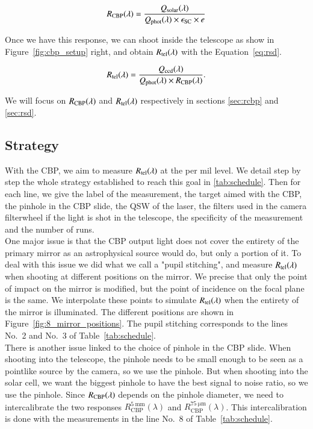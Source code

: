 \begin{equation}
    R_{\mathrm{CBP}}(\lambda) = \frac{Q_{\mathrm{solar}}(\lambda)}{Q_{\mathrm{phot}}(\lambda) \times \epsilon_{\mathrm{SC}} \times e}
    \label{eq:rcbp}
\end{equation} 

Once we have this response, we can shoot inside the \SD telescope as show in Figure~\ref{fig:cbp_setup} right, and obtain $R_{\mathrm{tel}}(\lambda)$ with the Equation~\ref{eq:rsd}.

\begin{equation}
    R_{\mathrm{tel}}(\lambda) = \frac{Q_{\mathrm{ccd}}(\lambda)}{Q_{\mathrm{phot}}(\lambda) \times R_{\mathrm{CBP}}(\lambda)}.
    \label{eq:rsd}
\end{equation}

We will focus on $R_{\mathrm{CBP}}(\lambda)$ and $R_{\mathrm{tel}}(\lambda)$ respectively in sections \ref{sec:rcbp} and \ref{sec:rsd}.

\subsection{Strategy}
\label{sec:strategy}

With the CBP, we aim to measure $R_{\mathrm{tel}}(\lambda)$ at the per mil level. We detail step by step the whole strategy established to reach this goal in \ref{tab:schedule}. Then for each line, we give the label of the measurement, the target aimed with the CBP, the pinhole in the CBP slide, the QSW of the laser, the filters used in the \SD camera filterwheel if the light is shot in the telescope, the specificity of the measurement and the number of runs. \\

One major issue is that the CBP output light does not cover the entirety of the \SD primary mirror as an astrophysical source would do, but only a portion of it. To deal with this issue we did what we call a "pupil stitching", and measure $R_{\mathrm{tel}}(\lambda)$ when shooting at different positions on the mirror. We precise that only the point of impact on the mirror is modified, but the point of incidence on the focal plane is the same. We interpolate these points to simulate $R_{\mathrm{tel}}(\lambda)$ when the entirety of the mirror is illuminated. The different positions are shown in Figure~\ref{fig:8_mirror_positions}. The pupil stitching corresponds to the lines No.~2 and No.~3 of Table~\ref{tab:schedule}. \\

There is another issue linked to the choice of pinhole in the CBP slide. When shooting into the \SD telescope, the pinhole needs to be small enough to be seen as a pointlike source by the \SD camera, so we use the \spinhole pinhole. But when shooting into the solar cell, we want the biggest pinhole to have the best signal to noise ratio, so we use the \bpinhole pinhole. Since $R_{\mathrm{CBP}}(\lambda)$ depends on the pinhole diameter, we need to intercalibrate the two responses $R_\mathrm{CBP}^{\mathrm{\SI{5}{\milli\meter}}} (\lambda)$ and $R_\mathrm{CBP}^{\mathrm{\SI{75}{\micro\meter}}} (\lambda)$. This intercalibration is done with the measurements in the line No.~8 of Table~\ref{tab:schedule}. \\

